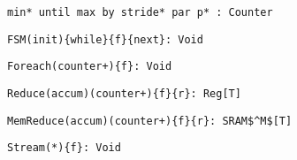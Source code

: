\newcommand{\desyntax}{\vspace{-10pt}}
\newcommand{\syntaxtitle}[1]{
\multicolumn{1}{l}{\bf{#1}} \vspace{-6pt} \\
\hspace{-4pt}\rule{0.48\columnwidth}{.4pt} \\
}

\begin{table*}
\centering

\newsavebox{\counter}
\begin{lrbox}{\counter}
\begin{lstlisting}[language=SpatialTable]
min* until max by stride* par p* : Counter
\end{lstlisting}
\end{lrbox}

\newsavebox{\fsmSignature}
\begin{lrbox}{\fsmSignature}
\begin{lstlisting}[language=SpatialTable]
FSM(init){while}{f}{next}: Void
\end{lstlisting}
\end{lrbox}

\newsavebox{\foreachSignature}
\begin{lrbox}{\foreachSignature}
\begin{lstlisting}[language=SpatialTable]
Foreach(counter+){f}: Void
\end{lstlisting}
\end{lrbox}

\newsavebox{\reduceSignature}
\begin{lrbox}{\reduceSignature}
\begin{lstlisting}[language=SpatialTable]
Reduce(accum)(counter+){f}{r}: Reg[T]
\end{lstlisting}
\end{lrbox}

\newsavebox{\memreduceSignature}
\begin{lrbox}{\memreduceSignature}
\begin{lstlisting}[language=SpatialTable]
MemReduce(accum)(counter+){f}{r}: SRAM$^M$[T]
\end{lstlisting}
\end{lrbox}

\newsavebox{\streamStar}
\begin{lrbox}{\streamStar}
\begin{lstlisting}[language=SpatialTable]
Stream(*){f}: Void
\end{lstlisting}
\end{lrbox}


\end{table*}
